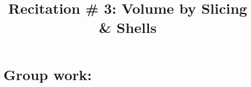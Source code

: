 \documentclass[handout]{ximera}
\title{Recitation \# 3: Volume by Slicing \& Shells}
\begin{document}
\begin{abstract}		\end{abstract}
\maketitle

\section{Group work:}
\end{document}
